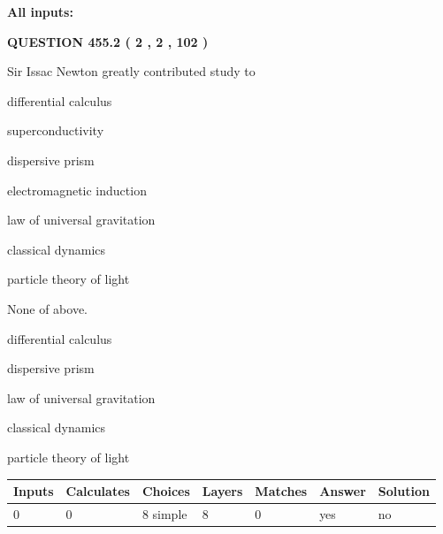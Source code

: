 \documentclass[12pt]{article}
\begin{document}
   
   
   
\noindent{}
   
   
   
   
\noindent\vspace{0.1in}\hspace{-0.08in} {\textbf{\Large{All inputs: }}}
   
   
  
\vspace{0.2in}
  
{\textbf{\Large{QUESTION
455.2 
 ( 2 , 2 , 102 )
}}}
  
  
Sir Issac Newton greatly contributed study to
 
 
differential calculus
 
 
superconductivity
 
 
dispersive prism
 
 
electromagnetic induction
 
 
law of universal gravitation
 
 
classical dynamics
 
 
particle theory of light
 
 
 None of above.
 
 
\noindent{}
 
 
differential calculus
 
 
dispersive prism
 
 
law of universal gravitation
 
 
classical dynamics
 
 
particle theory of light
 
 
\noindent{}
 
 
   
   
   
   
\noindent\begin{tabular}{|l|l|l|l|l|l|l|}
 \hline
Inputs & Calculates & Choices & Layers & Matches & Answer & Solution \\ \hline
 0  & 
 0  & 
 8
  simple  
  & 
 8  & 
 0  & 
  yes & 
  no 
  \\ \hline
 \end{tabular}
   
\end{document}
